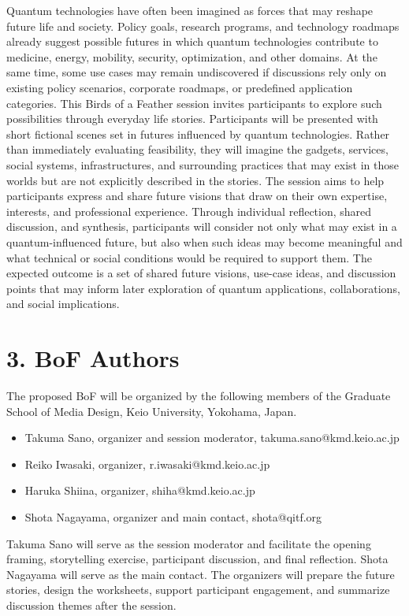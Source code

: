 \documentclass[10pt,conference]{IEEEtran}
\begin{document}
Quantum technologies have often been imagined as forces that may reshape future life and society. Policy goals, research programs, and technology roadmaps already suggest possible futures in which quantum technologies contribute to medicine, energy, mobility, security, optimization, and other domains. At the same time, some use cases may remain undiscovered if discussions rely only on existing policy scenarios, corporate roadmaps, or predefined application categories. This Birds of a Feather session invites participants to explore such possibilities through everyday life stories. Participants will be presented with short fictional scenes set in futures influenced by quantum technologies. Rather than immediately evaluating feasibility, they will imagine the gadgets, services, social systems, infrastructures, and surrounding practices that may exist in those worlds but are not explicitly described in the stories. The session aims to help participants express and share future visions that draw on their own expertise, interests, and professional experience. Through individual reflection, shared discussion, and synthesis, participants will consider not only what may exist in a quantum-influenced future, but also when such ideas may become meaningful and what technical or social conditions would be required to support them. The expected outcome is a set of shared future visions, use-case ideas, and discussion points that may inform later exploration of quantum applications, collaborations, and social implications.

\section*{3. BoF Authors}

The proposed BoF will be organized by the following members of the Graduate School of Media Design, Keio University, Yokohama, Japan.

\begin{itemize}
\item Takuma Sano, organizer and session moderator, takuma.sano@kmd.keio.ac.jp
\item Reiko Iwasaki, organizer, r.iwasaki@kmd.keio.ac.jp
\item Haruka Shiina, organizer, shiha@kmd.keio.ac.jp
\item Shota Nagayama, organizer and main contact, shota@qitf.org
\end{itemize}

Takuma Sano will serve as the session moderator and facilitate the opening framing, storytelling exercise, participant discussion, and final reflection. Shota Nagayama will serve as the main contact. The organizers will prepare the future stories, design the worksheets, support participant engagement, and summarize discussion themes after the session.
\end{document}
